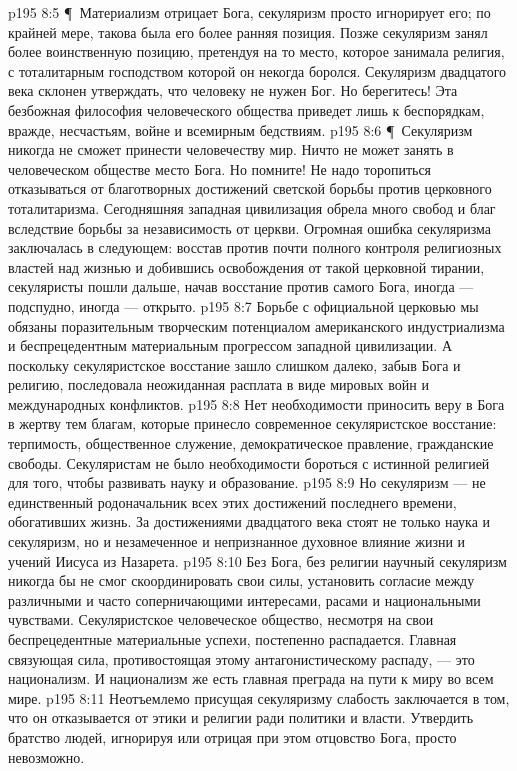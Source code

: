 \vs p195 8:5 \P\ Материализм отрицает Бога, секуляризм просто игнорирует его; по крайней мере, такова была его более ранняя позиция. Позже секуляризм занял более воинственную позицию, претендуя на то место, которое занимала религия, с тоталитарным господством которой он некогда боролся. Секуляризм двадцатого века склонен утверждать, что человеку не нужен Бог. Но берегитесь! Эта безбожная философия человеческого общества приведет лишь к беспорядкам, вражде, несчастьям, войне и всемирным бедствиям.
\vs p195 8:6 \P\ Секуляризм никогда не сможет принести человечеству мир. Ничто не может занять в человеческом обществе место Бога. Но помните! Не надо торопиться отказываться от благотворных достижений светской борьбы против церковного тоталитаризма. Сегодняшняя западная цивилизация обрела много свобод и благ вследствие борьбы за независимость от церкви. Огромная ошибка секуляризма заключалась в следующем: восстав против почти полного контроля религиозных властей над жизнью и добившись освобождения от такой церковной тирании, секуляристы пошли дальше, начав восстание против самого Бога, иногда --- подспудно, иногда --- открыто.
\vs p195 8:7 Борьбе с официальной церковью мы обязаны поразительным творческим потенциалом американского индустриализма и беспрецедентным материальным прогрессом западной цивилизации. А поскольку секуляристское восстание зашло слишком далеко, забыв Бога и  религию, последовала неожиданная расплата в виде мировых войн и международных конфликтов.
\vs p195 8:8 Нет необходимости приносить веру в Бога в жертву тем благам, которые принесло современное секуляристское восстание: терпимость, общественное служение, демократическое правление, гражданские свободы. Секуляристам не было необходимости бороться с истинной религией для того, чтобы развивать науку и образование.
\vs p195 8:9 Но секуляризм --- не единственный родоначальник всех этих достижений последнего времени, обогативших жизнь. За достижениями двадцатого века стоят не только наука и секуляризм, но и незамеченное и непризнанное духовное влияние жизни и учений Иисуса из Назарета.
\vs p195 8:10 Без Бога, без религии научный секуляризм никогда бы не смог скоординировать свои силы, установить согласие между различными и часто соперничающими интересами, расами и национальными чувствами. Секуляристское человеческое общество, несмотря на свои беспрецедентные материальные успехи, постепенно распадается. Главная связующая сила, противостоящая этому антагонистическому распаду, --- это национализм. И национализм же есть главная преграда на пути к миру во всем мире.
\vs p195 8:11 Неотъемлемо присущая секуляризму слабость заключается в том, что он отказывается от этики и религии ради политики и власти. Утвердить братство людей, игнорируя или отрицая при этом отцовство Бога, просто невозможно.
